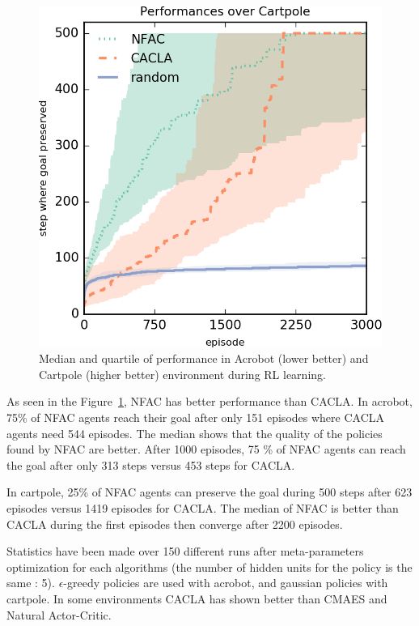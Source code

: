 \begin{figure}[h]
\begin{minipage}{.5\textwidth}
  \includegraphics[width=0.95\linewidth]{result_plotting/cartpole_perf.png}
\end{minipage}
\caption{ \label{fig:results} Median and quartile of performance in Acrobot (lower better) and Cartpole (higher better) environment during RL learning.}
\end{figure}

As seen in the Figure~\ref{fig:results}, NFAC has better performance than CACLA.
In acrobot, 75\% of NFAC agents reach their goal after only 151 episodes where CACLA agents need 544 episodes. The median shows that the quality
of the policies found by NFAC are better. After 1000 episodes, 75 \% of NFAC agents can reach the goal after only 313 steps versus 453 steps for CACLA.

In cartpole, 25\% of NFAC agents can preserve the goal during 500 steps after 623 episodes versus 1419 episodes for CACLA. The median of NFAC is better 
than CACLA during the first episodes then converge after 2200 episodes.

Statistics have been made over 150 different runs after meta-parameters optimization for each algorithms
(the number of hidden units for the policy is the same : 5).
$\epsilon$-greedy policies are used with acrobot, and gaussian policies with cartpole.
In some environments CACLA has shown better than CMAES and Natural Actor-Critic.